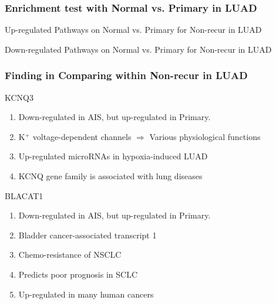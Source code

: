 \documentclass{beamer}
\begin{document}
    \begin{frame}
        \frametitle{Enrichment test with Normal vs. Primary in LUAD}

        \begin{table}
            \caption{Up-regulated Pathways on Normal vs. Primary for Non-recur in LUAD}
            \resizebox{\linewidth}{!}
            {}
        \end{table}

        \begin{table}
            \caption{Down-regulated Pathways on Normal vs. Primary for Non-recur in LUAD}
            \resizebox{\linewidth}{!}
            {}
        \end{table}
    \end{frame}

    \begin{frame}[allowframebreaks]
        \frametitle{Finding in Comparing within Non-recur in LUAD}

        \begin{block}{KCNQ3}
            \begin{enumerate}
                \item Down-regulated in AIS, but up-regulated in Primary.
                \item K$^+$ voltage-dependent channels $\Rightarrow$ Various physiological functions \cite{KCNQ3-1, KCNQ3-2, KCNQ3-3}
                \item Up-regulated microRNAs in hypoxia-induced LUAD \cite{KCNQ3-4}
                \item KCNQ gene family is associated with lung diseases \cite{KCNQ3-5}
            \end{enumerate}
        \end{block}

        \begin{block}{BLACAT1}
            \begin{enumerate}
                \item Down-regulated in AIS, but up-regulated in Primary.
                \item Bladder cancer-associated transcript 1
                \item Chemo-resistance of NSCLC \cite{BLACAT1-1}
                \item Predicts poor prognosis in SCLC \cite{BLACAT1-2}
                \item Up-regulated in many human cancers \cite{BLACAT1-3}
            \end{enumerate}
        \end{block}
    \end{frame}
\end{document}
